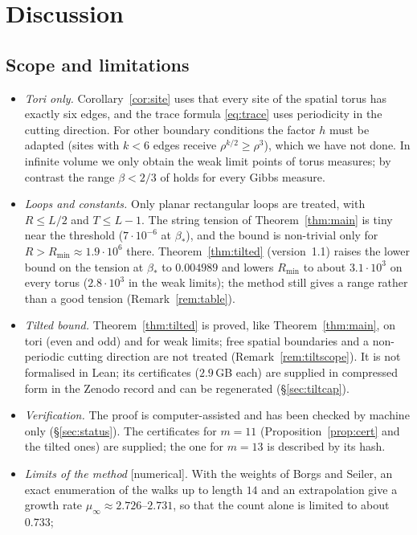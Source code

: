 \documentclass[11pt,a4paper]{article}
\theoremstyle{plain}
\theoremstyle{remark}
\numberwithin{equation}{section}
\newcommand{\st}[1]{\textsf{[#1]}}
\begin{document}
\section{Discussion}\label{sec:discussion}

\subsection{Scope and limitations}\label{sec:scope}
\begin{itemize}
\item \emph{Tori only.} Corollary~\ref{cor:site} uses that every site of the spatial torus has exactly six edges, and the trace
formula \eqref{eq:trace} uses periodicity in the cutting direction. For other boundary conditions the factor $h$ must be adapted
(sites with $k<6$ edges receive $\rho^{k/2}\ge\rho^3$), which we have not done. In infinite volume we only obtain the weak limit
points of torus measures; by contrast the range $\beta<2/3$ of \cite[Thm.~7.1]{D7} holds for every Gibbs measure.
\item \emph{Loops and constants.} Only planar rectangular loops are treated, with $R\le L/2$ and $T\le L-1$. The string tension of
Theorem~\ref{thm:main} is tiny near the threshold ($7\cdot10^{-6}$ at $\beta_*$), and the bound is non-trivial only for
$R>R_{\min}\approx1.9\cdot10^6$ there. Theorem~\ref{thm:tilted} (version~1.1) raises the lower bound on the tension at $\beta_*$ to $0.004989$
and lowers $R_{\min}$ to about $3.1\cdot10^{3}$ on every torus ($2.8\cdot10^{3}$ in the weak limits); the method still gives a range rather than a good tension (Remark~\ref{rem:table}).
\item \emph{Tilted bound.} Theorem~\ref{thm:tilted} is proved, like Theorem~\ref{thm:main}, on tori (even and odd) and for weak
limits; free spatial boundaries and a non-periodic cutting direction are not treated (Remark~\ref{rem:tiltscope}). It is not formalised
in Lean; its certificates ($2.9$\,GB each) are supplied in compressed form in the Zenodo record and can be regenerated
(\S\ref{sec:tiltcap}).
\item \emph{Verification.} The proof is computer-assisted and has been checked by machine only (\S\ref{sec:status}). The
certificates for $m=11$ (Proposition~\ref{prop:cert} and the tilted ones) are supplied; the one for $m=13$ is described by its hash.
\item \emph{Limits of the method} \st{numerical}. With the weights of Borgs and Seiler, an exact enumeration of the walks up to length
$14$ and an extrapolation give a growth rate $\mu_\infty\approx2.726$--$2.731$, so that the count alone is limited to about $0.733$;

\end{itemize}
\end{document}
